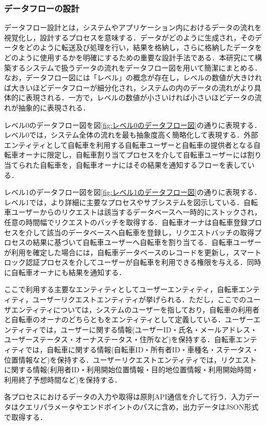       \subsubsection{データフローの設計}
        \label{sec:データフローの設計}
          \par データフロー設計とは，システムやアプリケーション内におけるデータの流れを視覚化し，設計するプロセスを意味する．データがどのように生成され，そのデータをどのように転送及び処理を行い，結果を格納し，さらに格納したデータをどのように使用するかを明確にするための重要な設計手法である．本研究にて構築するシステムで扱うデータの流れをデータフロー図を用いて簡潔にまとめる．なお，データフロー図には「レベル」の概念が存在し，レベルの数値が大きければ大きいほどデータフローが細分化され，システムの内のデータの流れがより具体的に表現される．一方で，レベルの数値が小さいければ小さいほどデータの流れが抽象的に表現される．
          \par レベル0のデータフロー図を図\ref{fig:レベル0のデータフロー図}の通りに表現する．レベル0では，システム全体の流れを最も抽象度高く簡略化して表現する．外部エンティティとして自転車を利用する自転車ユーザーと自転車の提供者となる自転車オーナに限定し，自転車割り当てプロセスを介して自転車ユーザーには割り当てられた自転車を，自転車オーナにはその結果を通知するフローを表している．
          \par レベル1のデータフロー図を図\ref{fig:レベル1のデータフロー図}の通りに表現する．レベル1では，より詳細に主要なプロセスやサブシステムを図示している．自転車ユーザーからのリクエストは該当するデータベースへ一時的にストックされ，任意の時間幅でリクエストのバッチを取得する．自転車オーナは自転車登録プロセスを介して該当のデータベースへ自転車を登録し，リクエストバッチの取得プロセスの結果に基づいて自転車ユーザーへ自転車を割り当てる．自転車ユーザーが利用を確定した場合には，自転車データベースのレコードを更新し，スマートロック認証プロセスを介してユーザーが自転車を利用できる権限を与える．同時に自転車オーナにも結果を通知する．
          \par ここで利用する主要なエンティティとしてユーザーエンティティ，自転車エンティティ，ユーザーリクエストエンティティが挙げられる．ただし，ここでのユーザエンティティについては，システムのユーザーを指しており，自転車の利用者と自転車のオーナのどちらともをエンティティとして定義している．ユーザーエンティティでは，ユーザーに関する情報(ユーザーID・氏名・メールアドレス・ユーザーステータス・オーナステータス・住所など)を保持する．自転車エンティティでは，自転車に関する情報(自転車ID・所有者ID・車種名・ステータス・位置情報など)を保持する．ユーザーリクエストエンティティでは，リクエストに関する情報(利用者ID・利用開始位置情報・目的地位置情報・利用開始時間・利用終了予想時間など)を保持する．
          \par 各プロセスにおけるデータの入力や取得は原則API通信を介して行う．入力データはクエリパラメータやエンドポイントのパスに含め，出力データはJSON形式で取得する．


